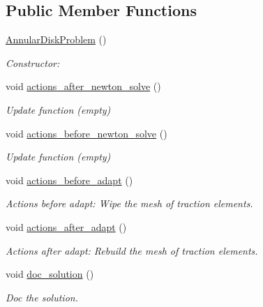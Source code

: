 \subsection*{Public Member Functions}
\begin{DoxyCompactItemize}
\item 
\hyperlink{classAnnularDiskProblem_aad1ce56fa5c26045fb14d46acf29c89e}{Annular\+Disk\+Problem} ()
\begin{DoxyCompactList}\small\item\em Constructor\+: \end{DoxyCompactList}\item 
void \hyperlink{classAnnularDiskProblem_a35d3a481c66849a57b9797c2338b8fc2}{actions\+\_\+after\+\_\+newton\+\_\+solve} ()
\begin{DoxyCompactList}\small\item\em Update function (empty) \end{DoxyCompactList}\item 
void \hyperlink{classAnnularDiskProblem_a147e5fbe37f7132bbace2b713acb03a5}{actions\+\_\+before\+\_\+newton\+\_\+solve} ()
\begin{DoxyCompactList}\small\item\em Update function (empty) \end{DoxyCompactList}\item 
void \hyperlink{classAnnularDiskProblem_a83c987045b1bdc704ed336072b8ceb16}{actions\+\_\+before\+\_\+adapt} ()
\begin{DoxyCompactList}\small\item\em Actions before adapt\+: Wipe the mesh of traction elements. \end{DoxyCompactList}\item 
void \hyperlink{classAnnularDiskProblem_a491ee3537f3b08d9a10942c4744d8d2b}{actions\+\_\+after\+\_\+adapt} ()
\begin{DoxyCompactList}\small\item\em Actions after adapt\+: Rebuild the mesh of traction elements. \end{DoxyCompactList}\item 
void \hyperlink{classAnnularDiskProblem_a8034c630f21ccf5882a21eef2c1464fc}{doc\+\_\+solution} ()
\begin{DoxyCompactList}\small\item\em Doc the solution. \end{DoxyCompactList}\end{DoxyCompactItemize}
